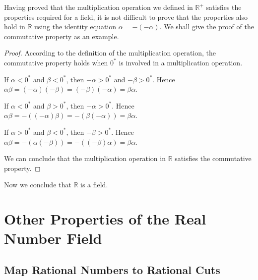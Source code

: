 \documentclass[onecolumn]{article}
\begin{document}
Having proved that the multiplication operation we defined in $\mathbb{R^+}$ 
satisfies the properties required for a field, it is not difficult to prove that 
the properties also hold in $\mathbb{R}$ using the identity equation 
$\alpha = -(-\alpha)$. We shall give the proof of the commutative property as an 
example.
\begin{proof}
  According to the definition of the multiplication operation, the commutative 
  property holds when $0^*$ is involved in a multiplication operation.

  If $\alpha < 0^*$ and $\beta < 0^*$, then $-\alpha > 0^*$ and $-\beta > 0^*$. 
  Hence $\alpha \beta = (-\alpha)(-\beta) = (-\beta)(-\alpha) = \beta \alpha$.

  If $\alpha < 0^*$ and $\beta > 0^*$, then $-\alpha > 0^*$. Hence 
  $\alpha \beta = -((-\alpha)\beta) = -(\beta(-\alpha)) = \beta \alpha$.

  If $\alpha > 0^*$ and $\beta < 0^*$, then $-\beta > 0^*$. Hence 
  $\alpha \beta = -(\alpha(-\beta)) = -((-\beta)\alpha) = \beta \alpha$.

  We can conclude that the multiplication operation in $\mathbb{R}$ satisfies 
  the commutative property.
\end{proof}

Now we conclude that $\mathbb{R}$ is a field.

\section{Other Properties of the Real Number Field}

\subsection{Map Rational Numbers to Rational Cuts}
\end{document}
